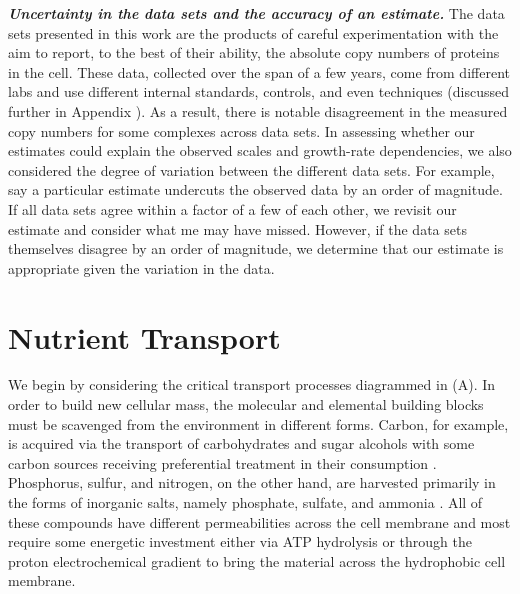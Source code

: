 \begin{featurebox}
\textbf{\itshape Uncertainty in the data sets and the accuracy of an estimate.}
The data sets presented in this work are the products of
careful experimentation with the aim to report, to the best of their ability,
the absolute copy numbers of proteins in the cell. These data, collected over
the span of a few years, come from different labs and use different internal
standards, controls, and even techniques (discussed further in Appendix ).
As a result, there is notable disagreement in the measured copy numbers for
some complexes across data sets. In assessing whether our estimates could explain the
observed scales and growth-rate dependencies, we also considered the degree of
variation between the different data sets. For example, say a particular
estimate undercuts the observed data by an order of magnitude. If all data sets
agree within a factor of a few of each other, we revisit our estimate and
consider what me may have missed. However, if the data sets themselves disagree
by an order of magnitude, we determine that our estimate is
appropriate given the variation in the data.
\label{box:estimate_rules}
\end{featurebox}


\section{Nutrient Transport}
We begin by considering the critical transport
processes diagrammed in (A). In order to build new cellular
mass, the molecular and elemental building blocks must be scavenged from the
environment in different forms. Carbon, for example, is acquired via the
transport of carbohydrates and sugar alcohols with some carbon sources
receiving preferential treatment in their consumption \citep{monod1947}.
Phosphorus, sulfur, and nitrogen, on the other hand, are harvested primarily
in the forms of inorganic salts, namely phosphate, sulfate, and ammonia
\citep{jun2018, assentoft2016, stasi2019, antonenko1997, rosenberg1977,
willsky1973}. All of these compounds have different permeabilities across the
cell membrane \citep{phillips2018} and most require some energetic investment
either via ATP hydrolysis or through the proton electrochemical gradient to
bring the material across the hydrophobic cell membrane.

